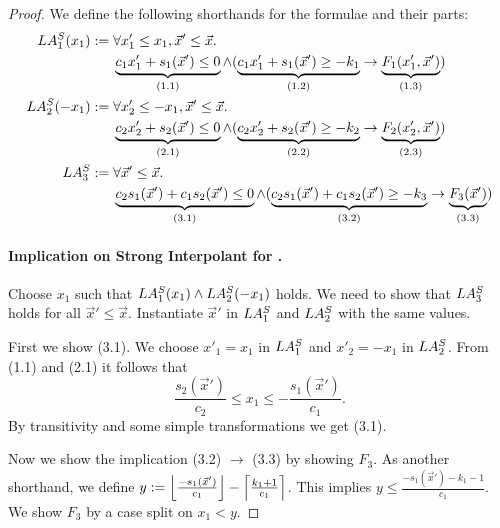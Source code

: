 \begin{techreport}
\begin{proof}
We define the following shorthands for the formulae and their parts: 
\begin{align*}
LA\S_1(x_1) & := 
 \forall x'_1\leq x_1,\vec x'\leq \vec x.\ \\
  &\phantom{{}:={}}
    \underbrace{c_1 x_1' + s_1(\vec x') \leq 0    }_{(1.1)} \land 
   (\underbrace{c_1 x_1' + s_1(\vec x') \geq -k_1 }_{(1.2)} \rightarrow
    \underbrace{F_1 (x_1', \vec x')               }_{(1.3)}) \\
%
LA\S_2(-x_1) & := 
 \forall x'_2\leq -x_1,\vec x'\leq \vec x.\ \\
  &\phantom{{}:={}}
   \underbrace{c_2 x_2' + s_2(\vec x') \leq 0     }_{(2.1)} \land
  (\underbrace{c_2 x_2' + s_2(\vec x') \geq -k_2  }_{(2.2)} \rightarrow
   \underbrace{F_2 (x_2', \vec x')                }_{(2.3)}) \\
%
LA\S_3 & := 
 \forall \vec x'\leq \vec x.\ \\
  &\phantom{{}:={}}
   \underbrace{c_2 s_1(\vec x') + c_1 s_2(\vec x') \leq 0    }_{(3.1)} \land
  (\underbrace{c_2 s_1(\vec x') + c_1 s_2(\vec x') \geq -k_3 }_{(3.2)} \rightarrow 
   \underbrace{F_3(\vec x')                                  }_{(3.3)} ) \\
\end{align*}

\paragraph*{Implication on Strong Interpolant for \laz.}

Choose $x_1$ such that $LA\S_1(x_1) \land LA\S_2(-x_1)$ holds.  We
need to show that $LA\S_3$ holds for all $\vec x' \leq \vec x$.  Instantiate
$\vec x'$ in $LA\S_1$ and $LA\S_2$ with the same values.  

First we show (3.1).  We choose $x'_1=x_1$ in $LA_1\S$ and $x'_2=-x_1$ in $LA_2\S$.
From (1.1) and (2.1) it follows that 
\[\frac{s_2(\vec x')}{c_2} \leq x_1 \leq -\frac{s_1(\vec x')}{c_1} \tag{$*$}.\] 
By transitivity and some simple transformations we get (3.1).

Now we show the implication (3.2) $\rightarrow$ (3.3) by showing $F_3$.
As another shorthand, we define $y := \floorfrac{-s_1(\vec x')}{c_1} -
\ceilfrac{k_1+1}{c_1}$.  This implies $y \leq \frac{-s_1(\vec x')-k_1-1}{c_1}$.
We show $F_3$ by a case split on $x_1 < y$.


\end{proof}
\end{techreport}
